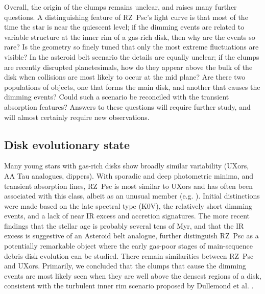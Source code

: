 \documentclass[]{rsos}
\begin{document}
Overall, the origin of the clumps remains unclear, and raises many further questions. A
distinguishing feature of RZ~Psc's light curve is that most of the time the star is near
the quiescent level; if the dimming events are related to variable structure at the inner
rim of a gas-rich disk, then why are the events so rare? Is the geometry so finely tuned
that only the most extreme fluctuations are visible? In the asteroid belt scenario the
details are equally unclear; if the clumps are recently disrupted planetesimals, how do
they appear above the bulk of the disk when collisions are most likely to occur at the
mid plane? Are there two populations of objects, one that forms the main disk, and
another that causes the dimming events? Could such a scenario be reconciled with the
transient absorption features? Answers to these questions will require further study, and
will almost certainly require new observations.

\subsection{Disk evolutionary state}\label{ss:evol}

Many young stars with gas-rich disks show broadly similar variability (UXors, AA Tau
analogues, dippers). With sporadic and deep photometric minima, and transient absorption
lines, RZ~Psc is most similar to UXors and has often been associated with this class,
albeit as an unusual member (e.g. \cite{2010A&A...524A...8G}). Initial distinctions were
made based on the late spectral type (K0V), the relatively short dimming events, and a
lack of near IR excess and accretion signatures. The more recent findings that the
stellar age is probably several tens of Myr, and that the IR excess is suggestive of an
Asteroid belt analogue, further distinguish RZ~Psc as a potentially remarkable object
where the early gas-poor stages of main-sequence debris disk evolution can be
studied. There remain similarities between RZ~Psc and UXors. Primarily, we concluded that
the clumps that cause the dimming events are most likely seen when they are well above
the densest regions of a disk, consistent with the turbulent inner rim scenario proposed
by Dullemond et al. \cite{2003ApJ...594L..47D}.
\end{document}
